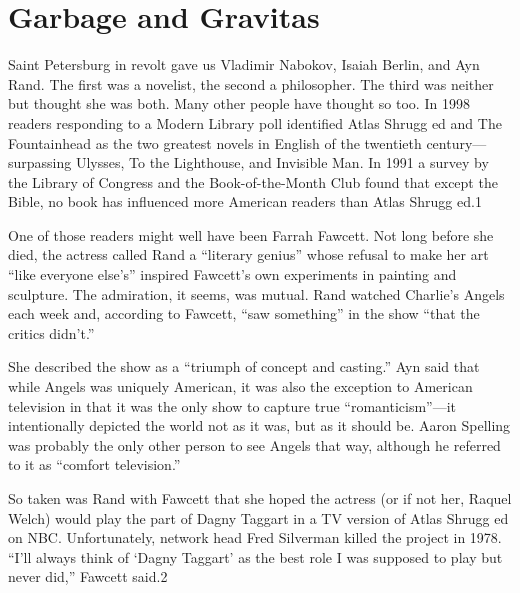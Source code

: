 \chapter{Garbage and Gravitas}\label{Garbage and Gravitas}
 \par 
Saint Petersburg in revolt gave us Vladimir Nabokov, Isaiah Berlin, and Ayn Rand. The first was a novelist, the second a philosopher. The third was neither but thought she was both. Many other people have thought so too. In 1998 readers responding to a Modern Library poll identified Atlas Shrugg ed and The Fountainhead as the two greatest novels in English of the twentieth century— surpassing Ulysses, To the Lighthouse, and Invisible Man. In 1991 a survey by the Library of Congress and the Book-of-the-Month Club found that except the Bible, no book has influenced more American readers than Atlas Shrugg ed.{\color{blue}1}
 \par 
One of those readers might well have been Farrah Fawcett. Not long before she died, the actress called Rand a “literary genius” whose refusal to make her art “like everyone else’s” inspired Fawcett’s own experiments in painting and sculpture. The admiration, it seems, was mutual. Rand watched Charlie’s Angels each week and, according to Fawcett, “saw something” in the show “that the critics didn’t.”
 \par 
She described the show as a “triumph of concept and casting.” Ayn said that while Angels was uniquely American, it was also the exception to American television in that it was the only show to capture true “romanticism”—it intentionally depicted the world not as it was, but as it should be. Aaron Spelling was probably the only other person to see Angels that way, although he referred to it as “comfort television.”
 \par 
So taken was Rand with Fawcett that she hoped the actress (or if not her, Raquel Welch) would play the part of Dagny Taggart in a TV version of Atlas Shrugg ed on NBC. Unfortunately, network head Fred Silverman killed the project in 1978. “I’ll always think of ‘Dagny Taggart’ as the best role I was supposed to play but never did,” Fawcett said.{\color{blue}2}
 \par 
